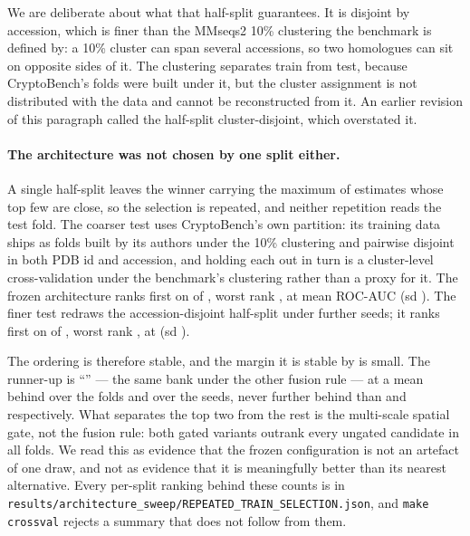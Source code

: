 \documentclass[11pt]{article}
\begin{document}
We are deliberate about what that half-split guarantees. It is disjoint by
accession, which is finer than the MMseqs2 10\% clustering the benchmark is
defined by: a 10\% cluster can span several accessions, so two homologues can
sit on opposite sides of it. The clustering separates train from test, because
CryptoBench's folds were built under it, but the cluster assignment is not
distributed with the data and cannot be reconstructed from it. An earlier
revision of this paragraph called the half-split cluster-disjoint, which
overstated it.

\paragraph{The architecture was not chosen by one split either.} A single
half-split leaves the winner carrying the maximum of \NCandidates{} estimates
whose top few are close, so the selection is repeated, and neither repetition
reads the test fold. The coarser test uses CryptoBench's own partition:
its training data ships as \NSplitsCv{} folds built by its authors under the
10\% clustering and pairwise disjoint in both PDB id and accession, and holding
each out in turn is a cluster-level cross-validation under the benchmark's
clustering rather than a proxy for it. The frozen architecture ranks first on
\NFirstCv{} of \NSplitsCv{}, worst rank \WorstRankCv{}, at mean ROC-AUC
\MeanAucCv{} (sd \SdAucCv{}). The finer test redraws the accession-disjoint
half-split under \NSplitsRh{} further seeds; it ranks first on \NFirstRh{} of
\NSplitsRh{}, worst rank \WorstRankRh{}, at \MeanAucRh{} (sd \SdAucRh{}).

The ordering is therefore stable, and the margin it is stable by is small. The
runner-up is ``\RunnerUpArch{}'' --- the same bank under the other fusion rule
--- at a mean \MeanMarginCv{} behind over the folds and \MeanMarginRh{} over the
seeds, never further behind than \WorstMarginCv{} and \WorstMarginRh{}
respectively. What separates the top two from the rest is the multi-scale
spatial gate, not the fusion rule: both gated variants outrank every ungated
candidate in all \NSplitsCv{} folds. We read this as evidence that the frozen
configuration is not an artefact of one draw, and not as evidence that it is
meaningfully better than its nearest alternative. Every per-split ranking behind
these counts is in
\texttt{results/architecture\_sweep/REPEATED\_TRAIN\_SELECTION.json}, and
\texttt{make crossval} rejects a summary that does not follow from them.
\end{document}

